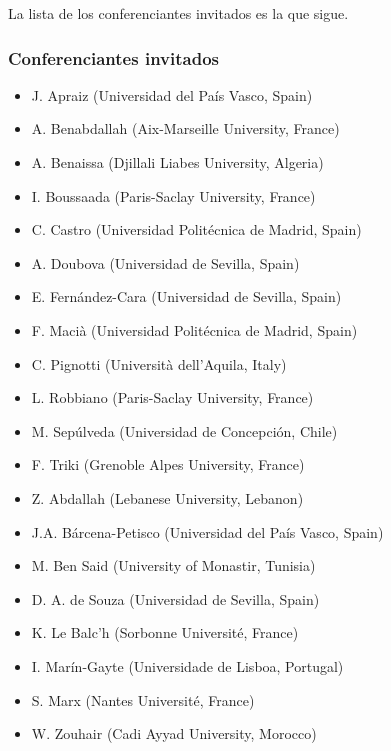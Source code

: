 \documentclass[twoside]{article}
\begin{document}
La lista de los conferenciantes invitados es la que sigue.



\subsubsection*{Conferenciantes invitados}
 
\begin{itemize}
\item J. Apraiz (Universidad del País Vasco, Spain)
\item A. Benabdallah (Aix-Marseille University, France)
\item A. Benaissa (Djillali Liabes University, Algeria)
\item I. Boussaada (Paris-Saclay University, France)
\item C. Castro (Universidad Politécnica de Madrid, Spain)
\item A. Doubova (Universidad de Sevilla, Spain)
\item E. Fernández-Cara (Universidad de Sevilla, Spain)
\item F. Macià (Universidad Politécnica de Madrid, Spain)
\item C. Pignotti (Università dell'Aquila, Italy)
\item L. Robbiano (Paris-Saclay University, France)
\item M. Sepúlveda (Universidad de Concepción, Chile)
\item F. Triki (Grenoble Alpes University, France)
\item Z. Abdallah (Lebanese University, Lebanon)
\item J.A. Bárcena-Petisco (Universidad del País Vasco, Spain)
\item M. Ben Said (University of Monastir, Tunisia)
\item D. A. de Souza (Universidad de Sevilla, Spain)
\item K. Le Balc'h (Sorbonne Université, France)
\item I. Marín-Gayte (Universidade de Lisboa, Portugal)
\item S. Marx (Nantes Université, France)
\item W. Zouhair (Cadi Ayyad University, Morocco)
\end{itemize}
\end{document}
